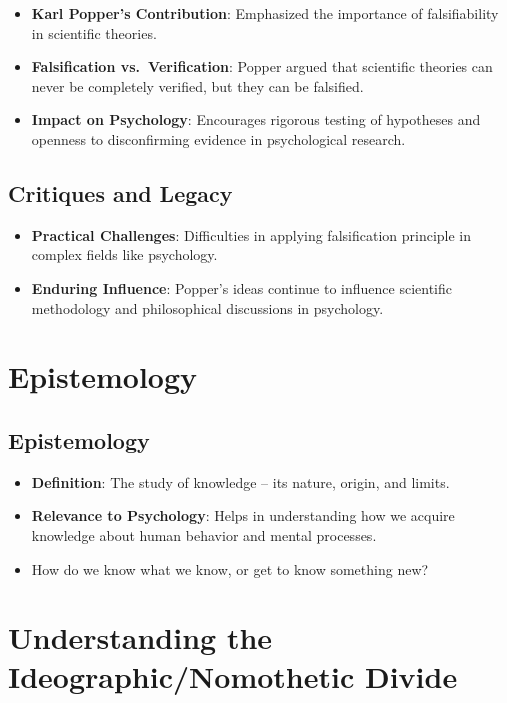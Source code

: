 \documentclass[
  letterpaper,
  DIV=11,
  numbers=noendperiod]{scrartcl}
\providecommand{\tightlist}{%
  \setlength{\itemsep}{0pt}\setlength{\parskip}{0pt}}\usepackage{longtable,booktabs,array}
\begin{document}
\begin{itemize}
\tightlist
\item
  \textbf{Karl Popper's Contribution}: Emphasized the importance of
  falsifiability in scientific theories.
\item
  \textbf{Falsification vs.~Verification}: Popper argued that scientific
  theories can never be completely verified, but they can be falsified.
\item
  \textbf{Impact on Psychology}: Encourages rigorous testing of
  hypotheses and openness to disconfirming evidence in psychological
  research.
\end{itemize}

\subsection{Critiques and Legacy}\label{critiques-and-legacy}

\begin{itemize}
\tightlist
\item
  \textbf{Practical Challenges}: Difficulties in applying falsification
  principle in complex fields like psychology.
\item
  \textbf{Enduring Influence}: Popper's ideas continue to influence
  scientific methodology and philosophical discussions in psychology.
\end{itemize}

\section{Epistemology}\label{epistemology}

\subsection{Epistemology}\label{epistemology-1}

\begin{itemize}
\tightlist
\item
  \textbf{Definition}: The study of knowledge -- its nature, origin, and
  limits.
\item
  \textbf{Relevance to Psychology}: Helps in understanding how we
  acquire knowledge about human behavior and mental processes.
\item
  How do we know what we know, or get to know something new?
\end{itemize}

\section{\texorpdfstring{Understanding the
\textbf{Ideographic/Nomothetic}
Divide}{Understanding the Ideographic/Nomothetic Divide}}\label{understanding-the-ideographicnomothetic-divide}
\end{document}

